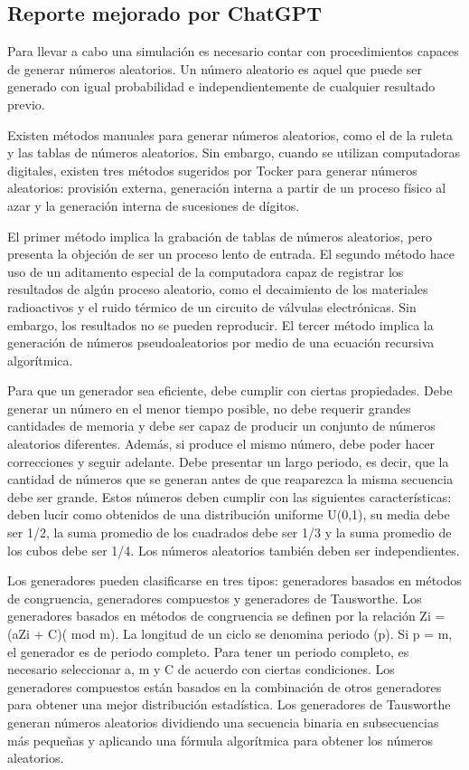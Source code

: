 \newpage
\subsection*{Reporte mejorado por ChatGPT}
\noindent Para llevar a cabo una simulación es necesario contar con procedimientos capaces de generar números aleatorios. Un número aleatorio es aquel que puede ser generado con igual probabilidad e independientemente de cualquier resultado previo.

Existen métodos manuales para generar números aleatorios, como el de la ruleta y las tablas de números aleatorios. Sin embargo, cuando se utilizan computadoras digitales, existen tres métodos sugeridos por Tocker para generar números aleatorios: provisión externa, generación interna a partir de un proceso físico al azar y la generación interna de sucesiones de dígitos.

El primer método implica la grabación de tablas de números aleatorios, pero presenta la objeción de ser un proceso lento de entrada. El segundo método hace uso de un aditamento especial de la computadora capaz de registrar los resultados de algún proceso aleatorio, como el decaimiento de los materiales radioactivos y el ruido térmico de un circuito de válvulas electrónicas. Sin embargo, los resultados no se pueden reproducir. El tercer método implica la generación de números pseudoaleatorios por medio de una ecuación recursiva algorítmica.

Para que un generador sea eficiente, debe cumplir con ciertas propiedades. Debe generar un número en el menor tiempo posible, no debe requerir grandes cantidades de memoria y debe ser capaz de producir un conjunto de números aleatorios diferentes. Además, si produce el mismo número, debe poder hacer correcciones y seguir adelante. Debe presentar un largo periodo, es decir, que la cantidad de números que se generan antes de que reaparezca la misma secuencia debe ser grande. Estos números deben cumplir con las siguientes características: deben lucir como obtenidos de una distribución uniforme U(0,1), su media debe ser 1/2, la suma promedio de los cuadrados debe ser 1/3 y la suma promedio de los cubos debe ser 1/4. Los números aleatorios también deben ser independientes.

Los generadores pueden clasificarse en tres tipos: generadores basados en métodos de congruencia, generadores compuestos y generadores de Tausworthe. Los generadores basados en métodos de congruencia se definen por la relación Zi = (aZi + C)( mod m). La longitud de un ciclo se denomina periodo (p). Si p = m, el generador es de periodo completo. Para tener un periodo completo, es necesario seleccionar a, m y C de acuerdo con ciertas condiciones. Los generadores compuestos están basados en la combinación de otros generadores para obtener una mejor distribución estadística. Los generadores de Tausworthe generan números aleatorios dividiendo una secuencia binaria en subsecuencias más pequeñas y aplicando una fórmula algorítmica para obtener los números aleatorios.

